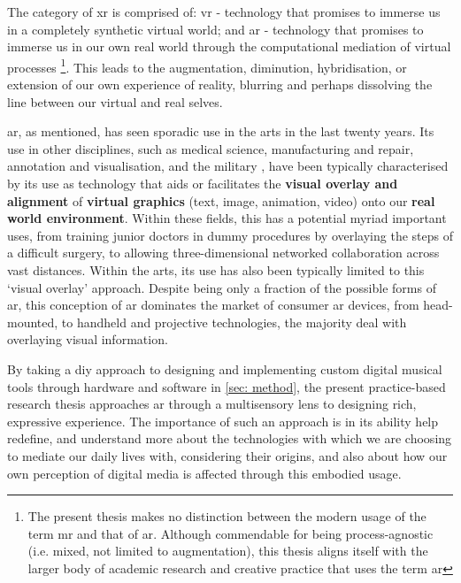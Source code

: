 The category of \gls{xr} is comprised of: \gls{vr} - technology that promises to immerse us in a completely synthetic virtual world; and \gls{ar} - technology that promises to immerse us in our own real world through the computational mediation of virtual processes \footnote{The present thesis makes no distinction between the modern usage of the term \gls{mr} and that of \gls{ar}. Although commendable for being process-agnostic (i.e. mixed, not limited to augmentation), this thesis aligns itself with the larger body of academic research and creative practice that uses the term \gls{ar}}. This leads to the augmentation, diminution, hybridisation, or extension of our own experience of reality, blurring and perhaps dissolving the line between our virtual and real selves.

\gls{ar}, as mentioned, has seen sporadic use in the arts in the last twenty years. Its use in other disciplines, such as medical science, manufacturing and repair, annotation and visualisation, and the military \citep{azuma1997}, have been typically characterised by its use as technology that aids or facilitates the \textbf{visual overlay and alignment} of \textbf{virtual graphics} (text, image, animation, video) onto our \textbf{real world environment}. Within these fields, this has a potential myriad important uses, from training junior doctors in dummy procedures by overlaying the steps of a difficult surgery, to allowing three-dimensional networked collaboration across vast distances. Within the arts, its use has also been typically limited to this `visual overlay' approach. Despite being only a fraction of the possible forms of \gls{ar}, this conception of \gls{ar} dominates the market of consumer \gls{ar} devices, from head-mounted, to handheld and projective technologies, the majority deal with overlaying visual information. 

By taking a \gls{diy} approach to designing and implementing custom digital musical tools through hardware and software in \autoref{sec: method}, the present practice-based research thesis approaches \gls{ar} through a multisensory lens to designing rich, expressive experience. The importance of such an approach is in its ability help redefine, and understand more about the technologies with which we are choosing to mediate our daily lives with, considering their origins, and also about how our own perception of digital media is affected through this embodied usage.



